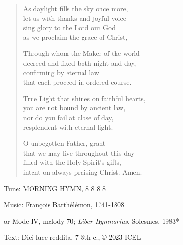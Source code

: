 \hymn

\begin{verse}
As daylight fills the sky once more,\\
let us with thanks and joyful voice\\
sing glory to the Lord our God\\
as we proclaim the grace of Christ,

Through whom the Maker of the world\\
decreed and fixed both night and day,\\
confirming by eternal law\\
that each proceed in ordered course.

True Light that shines on faithful hearts,\\
you are not bound by ancient law,\\
nor do you fail at close of day,\\
resplendent with eternal light.

O unbegotten Father, grant\\
that we may live throughout this day\\
filled with the Holy Spirit’s gifts,\\
intent on always praising Christ. Amen.
\end{verse}

\begin{hymnsource}
Tune: MORNING HYMN, 8 8 8 8

Music: François Barthélémon, 1741-1808

or Mode IV, melody 70; \emph{Liber Hymnarius}, Solesmes, 1983*

Text: Diei luce reddita, 7-8th c., © 2023 ICEL
\end{hymnsource}